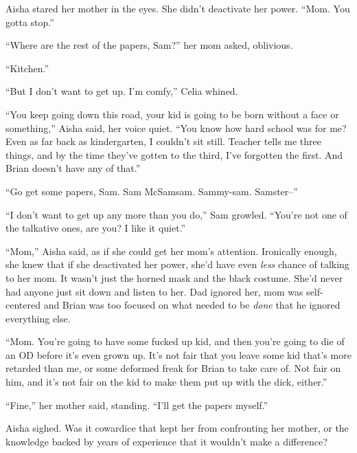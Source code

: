Aisha stared her mother in the eyes.  She didn't deactivate her power.  ``Mom.  You gotta stop.''



``Where are the rest of the papers, Sam?'' her mom asked, oblivious.



``Kitchen.''



``But I don't want to get up.  I'm comfy,'' Celia whined.



``You keep going down this road, your kid is going to be born without a face or something,'' Aisha said, her voice quiet.  ``You know how hard school was for me?  Even as far back as kindergarten, I couldn't sit still.  Teacher tells me three things, and by the time they've gotten to the third, I've forgotten the first.  And Brian doesn't have any of that.''



``Go get some papers, Sam.  Sam McSamsam.  Sammy-sam.  Samster--''



``I don't want to get up any more than you do,'' Sam growled.  ``You're not one of the talkative ones, are you?  I like it quiet.''



``Mom,'' Aisha said, as if she could get her mom's attention.  Ironically enough, she knew that if she deactivated her power, she'd have even \emph{less} chance of talking to her mom.  It wasn't just the horned mask and the black costume.  She'd never had anyone just sit down and listen to her.  Dad ignored her, mom was self-centered and Brian was too focused on what needed to be \emph{done} that he ignored everything else.



``Mom.  You're going to have some fucked up kid, and then you're going to die of an OD before it's even grown up.  It's not fair that you leave some kid that's more retarded than me, or some deformed freak for Brian to take care of.  Not fair on him, and it's not fair on the kid to make them put up with the dick, either.''



``Fine,'' her mother said, standing.  ``I'll get the papers myself.''



Aisha sighed.  Was it cowardice that kept her from confronting her mother, or the knowledge backed by years of experience that it wouldn't make a difference?




